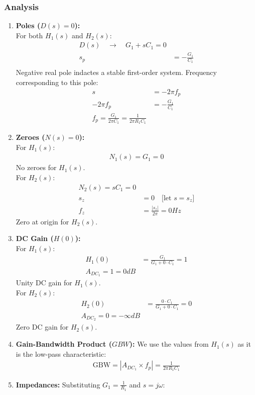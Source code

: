 \subsubsection{Analysis}
\begin{enumerate}
  \item \textbf{Poles (\(D(s) = 0\)):} \\
    For both \(H_1(s)\) and \(H_2(s)\):
      \begin{align*}
        D(s) \quad\rightarrow\quad G_1 + sC_1 = 0 \\
        s_p &= -\frac{G_1}{C_1} \\
      \end{align*}
    Negative real pole indactes a stable first-order system.
    Frequency corresponding to this pole:
    \begin{align*}
      s &= -2 \pi f_p \\
      -2 \pi f_p &= -\frac{G_1}{C_1} \\
      \boxed{f_p = \frac{G_1}{2 \pi C_1} = \frac{1}{2 \pi R_1 C_1}}
    \end{align*}
  \item \textbf{Zeroes (\(N(s) = 0\)):} \\
    For $H_1(s)$:
      \begin{align*}
        N_1(s) = G_1 = 0
      \end{align*}
    No zeroes for \(H_1(s)\). \\
    For $H_2(s)$:
      \begin{align*}
        N_2(s) = sC_1 = 0 \\
        s_z &= 0 \quad \text{[let \(s = s_z\)]}\\
        f_z &= \frac{|s_z|}{2\pi} = 0 Hz
      \end{align*}
    Zero at origin for \(H_2(s)\).
  \item \textbf{DC Gain (\(H(0)\)):} \\
    For \(H_1(s)\):
      \begin{align*}
        H_1(0) &= \frac{G_1}{G_1 + 0 \cdot C_1} = 1 \\
        \boxed{A_{DC_1} = 1 = 0 dB}
      \end{align*}
    Unity DC gain for \(H_1(s)\). \\
    For \(H_2(s)\):
      \begin{align*}
        H_2(0) &= \frac{0 \cdot C_1}{G_1 + 0 \cdot C_1} = 0 \\
        \boxed{A_{DC_2} = 0 = -\infty dB}
      \end{align*}
    Zero DC gain for \(H_2(s)\).
  \item \textbf{Gain-Bandwidth Product (\(GBW\)):}
    We use the values from \(H_1(s)\) as it is the
    low-pass characteristic:
    \begin{align*}
      \text{GBW} = |A_{DC_1} \times f_p| = \frac{1}{2\pi R_1C_1}
    \end{align*}
  \item \textbf{Impedances:}
    Substituting \(G_1 = \frac{1}{R_1}\) and \(s = j \omega\):

\end{enumerate}
